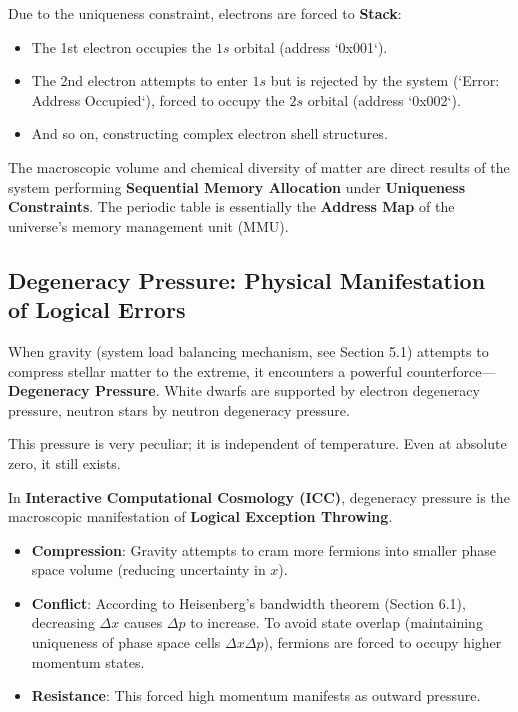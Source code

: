 Due to the uniqueness constraint, electrons are forced to \textbf{Stack}:

\begin{itemize}
\item The 1st electron occupies the $1s$ orbital (address `0x001`).

\item The 2nd electron attempts to enter $1s$ but is rejected by the system (`Error: Address Occupied`), forced to occupy the $2s$ orbital (address `0x002`).

\item And so on, constructing complex electron shell structures.
\end{itemize}

\begin{theorem}
The macroscopic volume and chemical diversity of matter are direct results of the system performing \textbf{Sequential Memory Allocation} under \textbf{Uniqueness Constraints}. The periodic table is essentially the \textbf{Address Map} of the universe's memory management unit (MMU).
\end{theorem}

\subsection{Degeneracy Pressure: Physical Manifestation of Logical Errors}

When gravity (system load balancing mechanism, see Section 5.1) attempts to compress stellar matter to the extreme, it encounters a powerful counterforce—\textbf{Degeneracy Pressure}. White dwarfs are supported by electron degeneracy pressure, neutron stars by neutron degeneracy pressure.

This pressure is very peculiar; it is independent of temperature. Even at absolute zero, it still exists.

In \textbf{Interactive Computational Cosmology (ICC)}, degeneracy pressure is the macroscopic manifestation of \textbf{Logical Exception Throwing}.

\begin{itemize}
\item \textbf{Compression}: Gravity attempts to cram more fermions into smaller phase space volume (reducing uncertainty in $x$).

\item \textbf{Conflict}: According to Heisenberg's bandwidth theorem (Section 6.1), decreasing $\Delta x$ causes $\Delta p$ to increase. To avoid state overlap (maintaining uniqueness of phase space cells $\Delta x \Delta p$), fermions are forced to occupy higher momentum states.

\item \textbf{Resistance}: This forced high momentum manifests as outward pressure.
\end{itemize}

